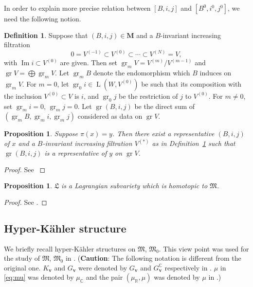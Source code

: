 \documentclass[12pt]{amsart}
\def\Bbb{\mathbb}
\def\frak{\mathfrak}
\newtheorem{Proposition}[equation]{Proposition}
\theoremstyle{definition}
\newtheorem{Definition}[equation]{Definition}
\theoremstyle{remark}
\numberwithin{equation}{subsection}
\newcommand{\C}{{\Bbb C}}
\newcommand{\R}{{\Bbb R}}
\newcommand{\Ima}{\operatorname{Im}}
\newcommand{\bM}{{\mathbf M}} %
\newcommand{\M}{{\frak M}} %
\newcommand{\La}{{\frak L}} %
\newcommand{\bv}{{\mathbf v}} %
\newcommand{\gr}{\operatorname{gr}} %
\newcommand{\HomL}{\operatorname{L}}
\begin{document}
In order to explain more precise relation between $[B,i,j]$ and
$[B^0,i^0,j^0]$, we need the following notion.

\begin{Definition}
Suppose that $(B, i, j)\in\bM$ and a $B$-invariant increasing filtration 
\[
       0 = V^{(-1)} \subset V^{(0)} \subset \cdots \subset V^{(N)} = V,
\]
with $\Ima i \subset V^{(0)}$ are given.
Then set $\gr_m V = V^{(m)}/V^{(m-1)}$ and $\gr V = \bigoplus \gr_m V$.
Let $\gr_m B$ denote the endomorphism which $B$ induces
on $\gr_m V$.
For $m = 0$, let $\gr_0 i\in \HomL(W, V^{(0)})$ be such that its
composition with the inclusion $V^{(0)} \subset V$ is $i$, and
$\gr_0 j$ be the restriction of $j$ to $V^{(0)}$.
For $m \ne 0$, set $\gr_m i = 0$, $\gr_m j = 0$.
Let $\gr (B, i, j)$ be the direct sum of $(\gr_m B, \gr_m i, \gr_m j)$
considered as data on $\gr V$.
\label{quiver:gr}\end{Definition}

\begin{Proposition}
Suppose $\pi(x) = y$.
Then there exist a representative $(B, i, j)$ of $x$ and a $B$-invariant
increasing filtration $V^{(*)}$ as in Definition~\ref{quiver:gr} such
that $\gr (B, i, j)$ is a representative of $y$ on $\gr V$.
\label{quiver:pi}\end{Proposition}
\begin{proof}
See \cite[3.20]{Na-alg}
\end{proof}

\begin{Proposition}\label{prop:homotopic}
$\La$ is a Lagrangian subvariety which is homotopic to $\M$.
\end{Proposition}
\begin{proof}
See \cite[5.5, 5.8]{Na-quiver}.
\end{proof}

\subsection{Hyper-K\"ahler structure}\label{subsec:hK}

We briefly recall hyper-K\"ahler structures on $\M$, $\M_0$. This view 
point was used for the study of $\M$, $\M_0$ in \cite{Na-quiver}.
({\bf Caution}: The following notation is different from the original
one. $K_\bv$ and $G_\bv$ were denoted by $G_\bv$ and
$G_\bv^\C$ respectively in \cite{Na-quiver}.
%
$\mu$ in \eqref{eq:mu} was denoted by $\mu_\C$ and the pair
$(\mu_\R,\mu)$ was denoted by $\mu$ in \cite{Na-quiver}.)
\end{document}
